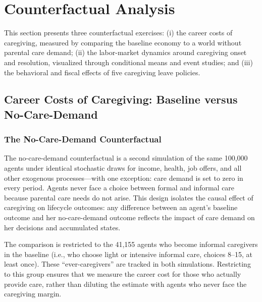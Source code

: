 
\section{Counterfactual Analysis}
\label{sec:counterfactuals}

This section presents three counterfactual exercises: (i) the career costs of caregiving, measured by comparing the baseline economy to a world without parental care demand; (ii) the labor-market dynamics around caregiving onset and resolution, visualized through conditional means and event studies; and (iii) the behavioral and fiscal effects of five caregiving leave policies.

\subsection{Career Costs of Caregiving: Baseline versus No-Care-Demand}
\label{subsec:career_costs_methodology}

\subsubsection{The No-Care-Demand Counterfactual}

The no-care-demand counterfactual is a second simulation of the same 100,000 agents under identical stochastic draws for income, health, job offers, and all other exogenous processes---with one exception: care demand is set to zero in every period. Agents never face a choice between formal and informal care because parental care needs do not arise. This design isolates the causal effect of caregiving on lifecycle outcomes: any difference between an agent's baseline outcome and her no-care-demand outcome reflects the impact of care demand on her decisions and accumulated states.

The comparison is restricted to the 41,155 agents who become informal caregivers in the baseline (i.e., who choose light or intensive informal care, choices 8--15, at least once). These ``ever-caregivers'' are tracked in both simulations. Restricting to this group ensures that we measure the career cost for those who actually provide care, rather than diluting the estimate with agents who never face the caregiving margin.

